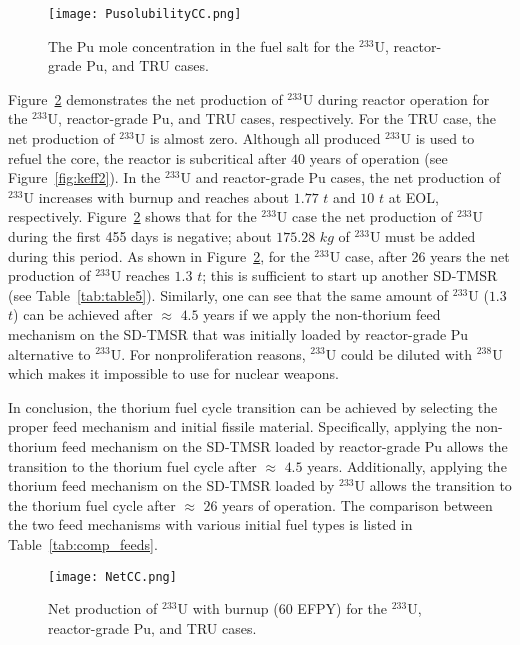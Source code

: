 \begin{figure}
	\centering
	\texttt{[image: PusolubilityCC.png]}
	\caption{The Pu mole concentration in the fuel salt for the $^{233}$U, reactor-grade Pu, and TRU cases.}
	\label{fig:PusolubilityCC}
\end{figure}
\FloatBarrier

Figure~\ref{fig:NetCC} demonstrates the net production of $^{233}$U during 
reactor operation for the $^{233}$U, reactor-grade Pu, and TRU cases, respectively. For the TRU case, the net production of $^{233}$U is almost 
zero. 
Although all produced $^{233}$U is used to refuel the core, the reactor is subcritical after $40$ years of operation (see Figure~\ref{fig:keff2}).
In the $^{233}$U and reactor-grade Pu cases, the net production of 
$^{233}$U increases with burnup and reaches about $1.77$ $t$ and $10$ $t$ at EOL, respectively. Figure~\ref{fig:NetCC} shows that for the $^{233}$U 
case the net production of $^{233}$U during the first 455 days is negative; 
about $175.28$ $kg$ of $^{233}$U must be added during this period. 
As shown in Figure~\ref{fig:NetCC}, for the $^{233}$U case, after 26 years the net production of $^{233}$U reaches 
$1.3$ $t$; this is sufficient to start up another SD-TMSR (see Table~\ref{tab:table5}). Similarly, 
one can see that the same amount of $^{233}$U ($1.3$ $t$) can be achieved 
after $\approx$ $4.5$ years if we apply the non-thorium feed mechanism on 
the SD-TMSR that was initially loaded by reactor-grade Pu alternative to 
$^{233}$U. For nonproliferation reasons, $^{233}$U could be diluted with $^{238}$U which makes it impossible to use for nuclear weapons.
  
In conclusion, the thorium fuel cycle transition can be achieved by selecting the 
proper feed mechanism and initial fissile material. 
Specifically, applying the non-thorium feed mechanism on 
the SD-TMSR loaded by reactor-grade Pu allows the 
transition to the thorium fuel cycle after $\approx$ 
$4.5$ years. Additionally, applying the thorium feed mechanism on 
the SD-TMSR loaded by $^{233}$U allows the 
transition to the thorium fuel cycle after $\approx$ $26$ years of operation. 
The comparison between the two feed mechanisms with various initial fuel types 
is listed in Table~\ref{tab:comp_feeds}. 

\begin{figure}
	\centering
	\texttt{[image: NetCC.png]}
	\caption{Net production of $^{233}$U with burnup (60 \gls{EFPY}) for the $^{233}$U, reactor-grade Pu, and TRU cases.}
	\label{fig:NetCC}
\end{figure}

